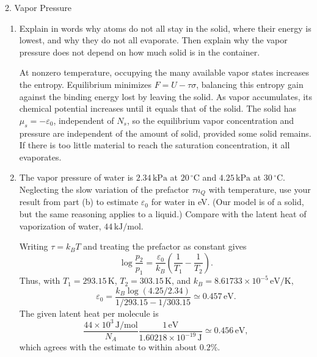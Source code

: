 \documentclass[11pt]{article}
\begin{document}
\begin{problem}{2. Vapor Pressure}
\begin{enumerate}[label=(\alph*)]
\begin{answer}
        \end{answer}
  \item Explain in words why atoms do not all stay in the solid, where their energy is lowest, and why they do not all evaporate.
  Then explain why the vapor pressure does not depend on how much solid is in the container.
  \begin{answer}
At nonzero temperature, occupying the many available vapor states increases the entropy. Equilibrium minimizes \(F=U-\tau\sigma\), balancing this entropy gain against the binding energy lost by leaving the solid. As vapor accumulates, its chemical potential increases until it equals that of the solid.
The solid has \(\mu_s=-\varepsilon_0\), independent of \(N_s\), so the equilibrium vapor concentration and pressure are independent of the amount of solid, provided some solid remains. If there is too little material to reach the saturation concentration, it all evaporates.
\end{answer}
\item The vapor pressure of water is \(2.34\,\mathrm{kPa}\) at \(20\,{}^\circ\mathrm{C}\) and \(4.25\,\mathrm{kPa}\) at \(30\,{}^\circ\mathrm{C}\).
  Neglecting the slow variation of the prefactor \(\tau n_Q\) with temperature, use your result from part (b) to estimate \(\varepsilon_0\) for water in eV.
  (Our model is of a solid, but the same reasoning applies to a liquid.)
  Compare with the latent heat of vaporization of water, \(44\,\mathrm{kJ/mol}\).
\begin{answer}
Writing \(\tau=k_BT\) and treating the prefactor as constant gives
\begin{equation}
\label{eq:p2-pressure-ratio}
\log\frac{p_2}{p_1}=\frac{\varepsilon_0}{k_B}\left(\frac{1}{T_1}-\frac{1}{T_2}\right).
\end{equation}
Thus, with \(T_1=293.15\,\mathrm K\), \(T_2=303.15\,\mathrm K\), and \(k_B=8.61733\times10^{-5}\,\mathrm{eV/K}\),
\begin{equation}
\label{eq:p2-binding-estimate}
\varepsilon_0=\frac{k_B\log(4.25/2.34)}{1/293.15-1/303.15}
\simeq\boxed{0.457\,\mathrm{eV}}.
\end{equation}
The given latent heat per molecule is
\begin{equation}
\label{eq:p2-latent-heat}
\frac{44\times10^3\,\mathrm{J/mol}}{N_A}
\frac{1\,\mathrm{eV}}{1.60218\times10^{-19}\,\mathrm J}
\simeq0.456\,\mathrm{eV},
\end{equation}
which agrees with the estimate to within about \(0.2\%\).
\end{answer}
\end{enumerate}
\end{problem}
\end{document}
